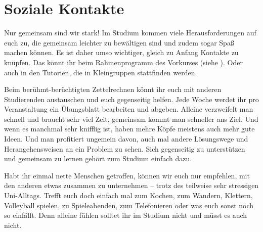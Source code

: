 \section{Soziale Kontakte}
Nur gemeinsam sind wir stark! Im Studium kommen viele Herausforderungen auf euch zu, die gemeinsam leichter zu bewältigen sind und zudem sogar Spaß machen können. Es ist daher umso wichtiger, gleich zu Anfang Kontakte zu knüpfen. Das könnt ihr \zB beim Rahmenprogramm des Vorkurses (siehe ). Oder auch in den Tutorien, die in Kleingruppen stattfinden werden.

Beim berühmt-berüchtigten Zettelrechnen könnt ihr euch mit anderen Studierenden austauschen und euch gegenseitig helfen. Jede Woche werdet ihr pro Veranstaltung ein Übungsblatt bearbeiten und abgeben. Alleine verzweifelt man schnell und braucht sehr viel Zeit, gemeinsam kommt man schneller ans Ziel. Und wenn es manchmal sehr knifflig ist, haben mehre Köpfe meistens auch mehr gute Ideen. Und man profitiert ungemein davon, auch mal andere Lösungswege und Herangehensweisen an ein Problem zu sehen. Sich gegenseitig zu unterstützen und gemeinsam zu lernen gehört zum Studium einfach dazu.

Habt ihr einmal nette Menschen getroffen, können wir euch nur empfehlen, mit den anderen etwas zusammen zu unternehmen -- trotz des teilweise sehr stressigen Uni-Alltags. Trefft euch doch einfach mal zum Kochen, zum Wandern, Klettern, Volleyball spielen, zu Spieleabenden, zum Telefonieren oder was euch sonst noch so einfällt. Denn alleine fühlen solltet ihr im Studium nicht und müsst es auch nicht.

\vfill
